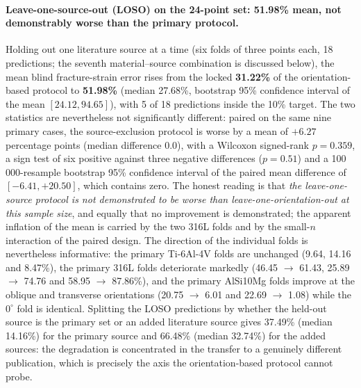 \documentclass[11pt,a4paper,twocolumn]{article}
\providecommand{\ang}[1]{\ensuremath{#1^{\circ}}}
\begin{document}
\paragraph{Leave-one-source-out (LOSO) on the 24-point set: 51.98\% mean, not demonstrably worse than the primary protocol.}
Holding out one literature source at a time (six folds of three points each, 18 predictions; the seventh
material--source combination is discussed below), the mean blind fracture-strain error rises from the
locked \textbf{31.22\%} of the orientation-based protocol to \textbf{51.98\%} (median 27.68\%, bootstrap
95\% confidence interval of the mean $[24.12, 94.65]$), with 5 of 18 predictions inside the 10\% target.
The two statistics are nevertheless not significantly different: paired on the same nine primary cases,
the source-exclusion protocol is worse by a mean of $+6.27$ percentage points (median difference 0.0),
with a Wilcoxon signed-rank $p = 0.359$, a sign test of six positive against three negative differences
($p = 0.51$) and a 100\,000-resample bootstrap 95\% confidence interval of the paired mean difference of
$[-6.41, +20.50]$, which contains zero. The honest reading is that \emph{the leave-one-source protocol is
not demonstrated to be worse than leave-one-orientation-out at this sample size}, and equally that no
improvement is demonstrated; the apparent inflation of the mean is carried by the two 316L folds and by
the small-$n$ interaction of the paired design. The direction of the individual folds is nevertheless
informative: the primary Ti-6Al-4V folds are unchanged (9.64, 14.16 and 8.47\%), the primary 316L folds
deteriorate markedly (46.45 $\to$ 61.43, 25.89 $\to$ 74.76 and 58.95 $\to$ 87.86\%), and the primary
AlSi10Mg folds improve at the oblique and transverse orientations (20.75 $\to$ 6.01 and 22.69 $\to$ 1.08)
while the $\ang{0}$ fold is identical. Splitting the LOSO predictions by whether the held-out source is
the primary set or an added literature source gives 37.49\% (median 14.16\%) for the primary source and
66.48\% (median 32.74\%) for the added sources: the degradation is concentrated in the transfer to a
genuinely different publication, which is precisely the axis the orientation-based protocol cannot probe.
\end{document}
